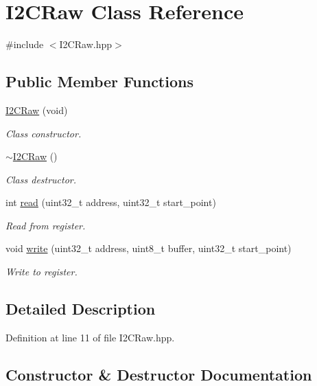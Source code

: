 \hypertarget{class_i2_c_raw}{}\section{I2\+C\+Raw Class Reference}
\label{class_i2_c_raw}


{\ttfamily \#include $<$I2\+C\+Raw.\+hpp$>$}

\subsection*{Public Member Functions}
\begin{DoxyCompactItemize}
\item 
\hyperlink{class_i2_c_raw_a8df65f9a9dc54dbc75205594a2d9b9f7}{I2\+C\+Raw} (void)
\begin{DoxyCompactList}\small\item\em Class constructor. \end{DoxyCompactList}\item 
\hyperlink{class_i2_c_raw_a9e5a7ede7b48487b67d7020d609a6ae6}{$\sim$\+I2\+C\+Raw} ()
\begin{DoxyCompactList}\small\item\em Class destructor. \end{DoxyCompactList}\item 
int \hyperlink{class_i2_c_raw_a35dd63654acfea8ddd46fddbcae8569b}{read} (uint32\+\_\+t address, uint32\+\_\+t start\+\_\+point)
\begin{DoxyCompactList}\small\item\em Read from register. \end{DoxyCompactList}\item 
void \hyperlink{class_i2_c_raw_a0e7b8c5f728e0805bb31c20fdbd77a33}{write} (uint32\+\_\+t address, uint8\+\_\+t buffer, uint32\+\_\+t start\+\_\+point)
\begin{DoxyCompactList}\small\item\em Write to register. \end{DoxyCompactList}\end{DoxyCompactItemize}


\subsection{Detailed Description}


Definition at line 11 of file I2\+C\+Raw.\+hpp.



\subsection{Constructor \& Destructor Documentation}
